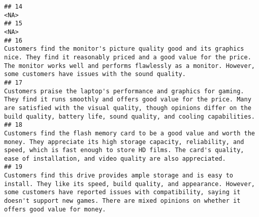 \documentclass[
]{article}
\begin{document}
\begin{verbatim}
## 14                                                                                                                                                                                                                                                                                                                                                                                                                                                                                   <NA>
## 15                                                                                                                                                                                                                                                                                                                                                                                                                                                                                   <NA>
## 16                                                                                                                                                                                                                       Customers find the monitor's picture quality good and its graphics nice. They find it reasonably priced and a good value for the price. The monitor works well and performs flawlessly as a monitor. However, some customers have issues with the sound quality.
## 17                                                                                                                                                                                                     Customers praise the laptop's performance and graphics for gaming. They find it runs smoothly and offers good value for the price. Many are satisfied with the visual quality, though opinions differ on the build quality, battery life, sound quality, and cooling capabilities.
## 18                                                                                                                                                                                                              Customers find the flash memory card to be a good value and worth the money. They appreciate its high storage capacity, reliability, and speed, which is fast enough to store HD films. The card's quality, ease of installation, and video quality are also appreciated.
## 19                                                                                                                                                                                 Customers find this drive provides ample storage and is easy to install. They like its speed, build quality, and appearance. However, some customers have reported issues with compatibility, saying it doesn't support new games. There are mixed opinions on whether it offers good value for money.

\end{verbatim}
\end{document}
